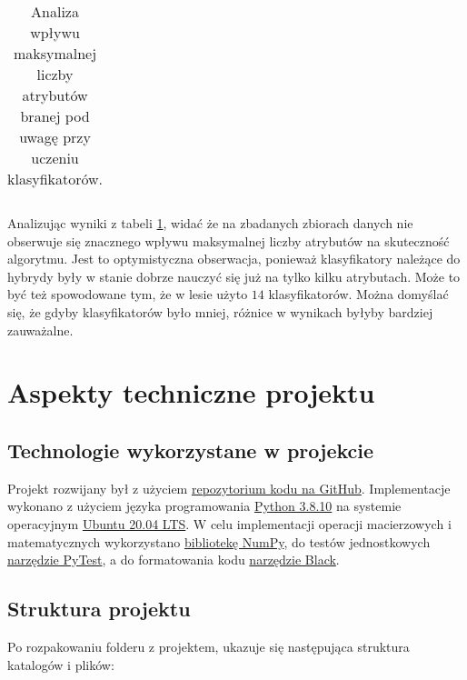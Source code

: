 \documentclass[
    left=2.5cm,         %
    right=2.5cm,        %
    top=2.5cm,          %
    bottom=3cm,         %
    bindingoffset=6mm,  %
    nohyphenation=false %
]{eiti/eiti-report}
\begin{document}
\begin{table}[H]
\begin{tabular}{ |p{2cm}||p{3cm}|p{2cm}|p{2cm}|p{2cm}|p{2cm}|  }
     \hline
\end{tabular}
\caption{Analiza wpływu maksymalnej liczby atrybutów branej pod uwagę przy uczeniu klasyfikatorów.}
\label{tab:attr_table}
\end{table}

Analizując wyniki z tabeli \ref{tab:attr_table}, widać że na zbadanych zbiorach danych nie obserwuje się znacznego wpływu maksymalnej liczby atrybutów na skuteczność algorytmu. Jest to optymistyczna obserwacja, ponieważ klasyfikatory należące do hybrydy były w stanie dobrze nauczyć się już na tylko kilku atrybutach. Może to być też spowodowane tym, że w lesie użyto $14$ klasyfikatorów. Można domyślać się, że gdyby klasyfikatorów było mniej, różnice w wynikach byłyby bardziej zauważalne.


\section{Aspekty techniczne projektu}
\subsection{Technologie wykorzystane w projekcie}
Projekt rozwijany był z użyciem \href{https://github.com/bartooo/random-forest-svm-hybrid}{repozytorium kodu na GitHub}. Implementacje wykonano z użyciem języka programowania \href{https://www.python.org}{Python 3.8.10} na systemie operacyjnym \href{https://ubuntu.com}{Ubuntu 20.04 LTS}. W celu implementacji operacji macierzowych i matematycznych wykorzystano \href{https://numpy.org}{bibliotekę NumPy}, do testów jednostkowych \href{https://docs.pytest.org/en/7.1.x/}{narzędzie PyTest}, a do formatowania kodu \href{https://github.com/psf/black}{narzędzie Black}.
\subsection{Struktura projektu}

Po rozpakowaniu folderu z projektem, ukazuje się następująca struktura katalogów i plików:
\end{document}

